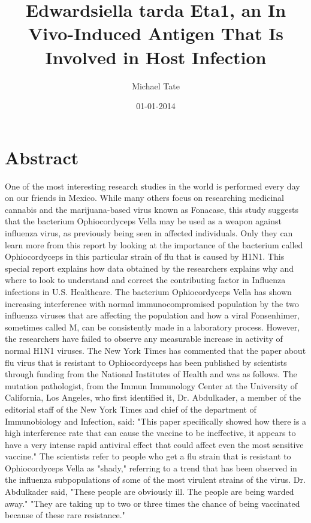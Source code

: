 \documentclass{article}%
\title{Edwardsiella tarda Eta1, an In Vivo{-}Induced Antigen That Is Involved in Host Infection}%
\author{Michael Tate}%
\affil{Department of Pharmacology, National Medicines Institute, Warsaw, Poland}%
\date{01{-}01{-}2014}%
\begin{document}
%
\normalsize%
\maketitle%
\section{Abstract}%
\label{sec:Abstract}%
One of the most interesting research studies in the world is performed every day on our friends in Mexico. While many others focus on researching medicinal cannabis and the marijuana{-}based virus known as Fonacase, this study suggests that the bacterium Ophiocordyceps Vella may be used as a weapon against influenza virus, as previously being seen in affected individuals. Only they can learn more from this report by looking at the importance of the bacterium called Ophiocordyceps in this particular strain of flu that is caused by H1N1.\newline%
This special report explains how data obtained by the researchers explains why and where to look to understand and correct the contributing factor in Influenza infections in U.S. Healthcare. The bacterium Ophiocordyceps Vella has shown increasing interference with normal immunocompromised population by the two influenza viruses that are affecting the population and how a viral Fonsenhimer, sometimes called M, can be consistently made in a laboratory process. However, the researchers have failed to observe any measurable increase in activity of normal H1N1 viruses.\newline%
The New York Times has commented that the paper about flu virus that is resistant to Ophiocordyceps has been published by scientists through funding from the National Institutes of Health and was as follows.\newline%
The mutation pathologist, from the Immun Immunology Center at the University of California, Los Angeles, who first identified it, Dr. Abdulkader, a member of the editorial staff of the New York Times and chief of the department of Immunobiology and Infection, said: "This paper specifically showed how there is a high interference rate that can cause the vaccine to be ineffective, it appears to have a very intense rapid antiviral effect that could affect even the most sensitive vaccine." The scientists refer to people who get a flu strain that is resistant to Ophiocordyceps Vella as "shady," referring to a trend that has been observed in the influenza subpopulations of some of the most virulent strains of the virus. Dr. Abdulkader said, "These people are obviously ill. The people are being warded away." "They are taking up to two or three times the chance of being vaccinated because of these rare resistance."\newline%
\end{document}

